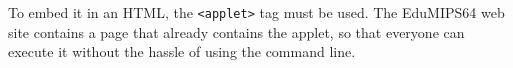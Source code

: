 \documentclass[12pt]{report}
\newcommand{\EM}{EduMIPS64}
\begin{document}
To embed it in an HTML, the \texttt{<applet>} tag must be used. The \EM{} web
site contains a page that already contains the applet, so
that everyone can execute it without the hassle of using the command line.


\printindex
\end{document}
